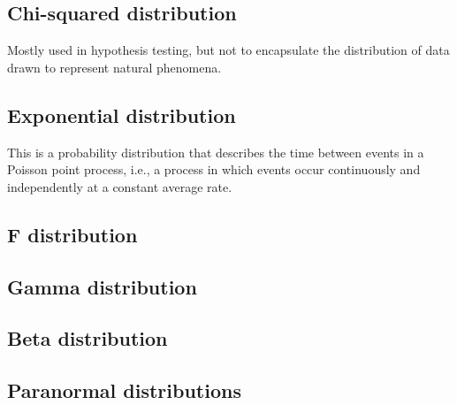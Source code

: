 \documentclass[english,10pt,a4paper,oneside]{book}
\theoremstyle{definition}
\theoremstyle{definition}
\theoremstyle{definition}
\theoremstyle{remark}
\begin{document}
\hypertarget{chi-squared-distribution}{%
\subsection{Chi-squared distribution}\label{chi-squared-distribution}}

Mostly used in hypothesis testing, but not to encapsulate the
distribution of data drawn to represent natural phenomena.

\hypertarget{exponential-distribution}{%
\subsection{Exponential distribution}\label{exponential-distribution}}

This is a probability distribution that describes the time between
events in a Poisson point process, i.e., a process in which events occur
continuously and independently at a constant average rate.

\hypertarget{f-distribution}{%
\subsection{F distribution}\label{f-distribution}}

\hypertarget{gamma-distribution}{%
\subsection{Gamma distribution}\label{gamma-distribution}}

\hypertarget{beta-distribution}{%
\subsection{Beta distribution}\label{beta-distribution}}

\hypertarget{paranormal-distributions}{%
\subsection{Paranormal distributions}\label{paranormal-distributions}}
\end{document}
